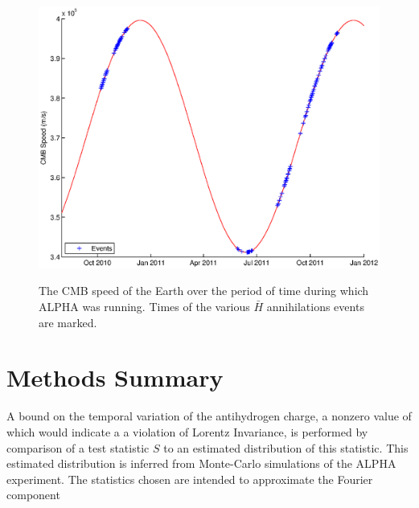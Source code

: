 \documentclass[superscriptaddress,aps,prb,11pt]{revtex4-1}
\begin{document}
\begin{figure}
  \includegraphics[scale=0.3]{True_Event_Distribution.eps}
  \label{fig:true_event_distribution}
  \caption{The CMB speed of the Earth over the period of time during which ALPHA was running.  Times of the various $\bar{H}$ annihilations events are marked.}
\end{figure}

\section{Methods Summary}
A bound on the temporal variation of the antihydrogen charge, a nonzero value of which would indicate a a violation of Lorentz Invariance, is performed by comparison of a test statistic $S$ to an estimated distribution of this statistic.  This estimated distribution is inferred from Monte-Carlo simulations of the ALPHA experiment.  The statistics chosen are intended to approximate the Fourier component
\end{document}

